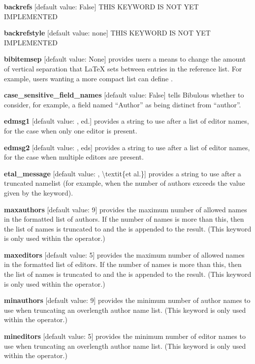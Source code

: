 \documentclass[letterpaper,10pt,english]{sphinxmanual}
\begin{document}
\textbf{backrefs} {[}default value: False{]} THIS KEYWORD IS NOT YET IMPLEMENTED

\textbf{backrefstyle} {[}default value: none{]} THIS KEYWORD IS NOT YET IMPLEMENTED

\textbf{bibitemsep} {[}default value: None{]} provides users a means to change the amount of vertical separation that LaTeX sets between entries in the reference list. For example, users wanting a more compact list can define .

\textbf{case\_sensitive\_field\_names} {[}default value: False{]} tells Bibulous whether to consider, for example, a field named ``Author'' as being distinct from ``author''.

\textbf{edmsg1} {[}default value: , ed.{]} provides a string to use after a list of editor names, for the case when only one editor is present.

\textbf{edmsg2} {[}default value: , eds{]} provides a string to use after a list of editor names, for the case when multiple editors are present.

\textbf{etal\_message} {[}default value: , \textbackslash{}textit\{et al.\}{]} provides a string to use after a truncated namelist (for example, when the number of authors exceeds the value given by the  keyword).

\textbf{maxauthors} {[}default value: 9{]} provides the maximum number of allowed names in the formatted list of authors. If the number of names is more than this, then the list of names is truncated to  and the  is appended to the result. (This keyword is only used within the  operator.)

\textbf{maxeditors} {[}default value: 5{]} provides the maximum number of allowed names in the formatted list of editors. If the number of names is more than this, then the list of names is truncated to  and the  is appended to the result. (This keyword is only used within the  operator.)

\textbf{minauthors} {[}default value: 9{]} provides the minimum number of author names to use when truncating an overlength author name list. (This keyword is only used within the  operator.)

\textbf{mineditors} {[}default value: 5{]} provides the minimum number of editor names to use when truncating an overlength author name list. (This keyword is only used within the  operator.)
\end{document}
